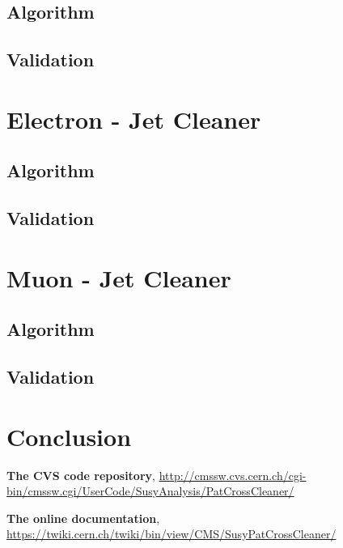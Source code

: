 \documentclass{cmspaper}
\begin{document}
\subsection{Algorithm}
\subsection{Validation}

\section{Electron - Jet Cleaner}%
\subsection{Algorithm}
\subsection{Validation}

\section{Muon - Jet Cleaner}
\subsection{Algorithm}
\subsection{Validation}

\section{Conclusion}


\pagebreak
\begin{thebibliography}{9}
   {\bf The CVS code repository},
    \underline{http://cmssw.cvs.cern.ch/cgi-bin/cmssw.cgi/UserCode/SusyAnalysis/PatCrossCleaner/}

   {\bf The online documentation},
    \underline{https://twiki.cern.ch/twiki/bin/view/CMS/SusyPatCrossCleaner/}
\end{thebibliography}
 
\end{document}
